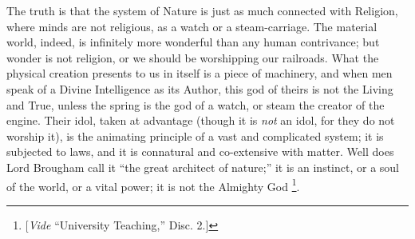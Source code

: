 The truth is that the system of Nature is just as much connected
with Religion, where minds are not religious, as a watch or a
steam-carriage. The material world, indeed, is infinitely more
wonderful than any human contrivance; but wonder is not religion, or
we should be worshipping our railroads. What the physical creation
presents to us in itself is a piece of machinery, and when men speak
of a Divine Intelligence as its Author, this god of theirs is not the
Living and True, unless the spring is the god of a watch, or steam the
creator of the engine. Their idol, taken at advantage (though it is \emph{not}
an idol, for they do not worship it), is the animating principle of a
vast and complicated system; it is subjected to laws, and it is
connatural and co-extensive with matter. Well does Lord Brougham call
it ``the great architect of nature;'' it is an instinct, or a
soul of the world, or a vital power; it is not the Almighty God \footnote{[\emph{Vide} ``University
Teaching,'' Disc. 2.]}.

